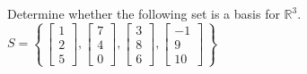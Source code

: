 \documentclass{ximera}
\begin{document}
\begin{problem}
  Determine whether the following set is a basis for $\mathbb{R}^3$.
  $S=\left\{\,  \begin{bmatrix}
      1 \\
      2 \\
      5 
    \end{bmatrix}, \begin{bmatrix}
      7 \\
      4 \\
      0 
    \end{bmatrix}, \begin{bmatrix}
      3 \\
      8 \\
      6 
    \end{bmatrix}, \begin{bmatrix}
      -1 \\
      9 \\
      10 
    \end{bmatrix} \,\right\}$
    \begin{multipleChoice}
  \end{multipleChoice}
\end{problem}
\end{document}
